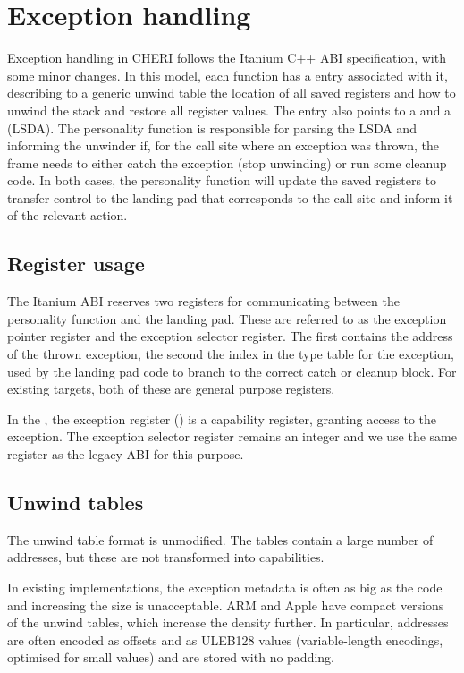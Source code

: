 \section{Exception handling}

Exception handling in CHERI follows the Itanium C++ ABI specification, with some minor changes.
In this model, each function has a  entry associated with it, describing to a generic unwind table the location of all saved registers and how to unwind the stack and restore all register values.
The  entry also points to a  and a  (LSDA).
The personality function is responsible for parsing the LSDA and informing the unwinder if, for the call site where an exception was thrown, the frame needs to either catch the exception (stop unwinding) or run some cleanup code.
In both cases, the personality function will update the saved registers to transfer control to the landing pad that corresponds to the call site and inform it of the relevant action.

\subsection{Register usage}

The Itanium ABI reserves two registers for communicating between the personality function and the landing pad.
These are referred to as the exception pointer register and the exception selector register.
The first contains the address of the thrown exception, the second the index in the type table for the exception, used by the landing pad code to branch to the correct catch or cleanup block.
For existing targets, both of these are general purpose registers.

In the \sandboxABI{}, the exception register () is a capability register, granting access to the exception.
The exception selector register remains an integer and we use the same register as the legacy ABI for this purpose.

\subsection{Unwind tables}

The unwind table format is unmodified.
The tables contain a large number of addresses, but these are not transformed into capabilities.

In existing implementations, the exception metadata is often as big as the code and increasing the size is unacceptable.
ARM and Apple have compact versions of the unwind tables, which increase the density further.
In particular, addresses are often encoded as offsets and as ULEB128 values (variable-length encodings, optimised for small values) and are stored with no padding.

